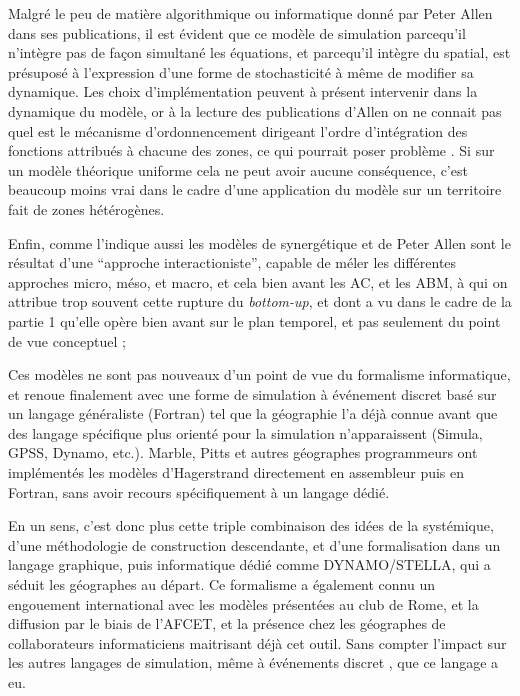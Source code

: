 Malgré le peu de matière algorithmique ou informatique donné par Peter Allen dans ses publications, il est évident que ce modèle de simulation parcequ'il n'intègre pas de façon simultané les équations, et parcequ'il intègre du spatial, est présuposé à l'expression d'une forme de stochasticité à même de modifier sa dynamique. Les choix d'implémentation peuvent à présent intervenir dans la dynamique du modèle, or à la lecture des publications d'Allen on ne connait pas quel est le mécanisme d'ordonnencement dirigeant l'ordre d'intégration des fonctions attribués à chacune des zones, ce qui pourrait poser problème \autocite[231-233]{Varenne2014}. Si sur un modèle théorique uniforme cela ne peut avoir aucune conséquence, c'est beaucoup moins vrai dans le cadre d'une application du modèle sur un territoire fait de zones hétérogènes.

Enfin, comme l'indique aussi \textcites[850]{Sanders2013}{Pumain2013} les modèles de synergétique et de Peter Allen sont le résultat d'une \enquote{approche interactioniste}, capable de méler les différentes approches micro, méso, et macro, et cela bien avant les AC, et les ABM, à qui on attribue trop souvent cette rupture du \textit{bottom-up}, et dont a vu dans le cadre de la partie 1 qu'elle opère bien avant sur le plan temporel, et pas seulement du point de vue conceptuel \autocites{Orcutt1957,Hagerstrand1967};

Ces modèles ne sont pas nouveaux d'un point de vue du formalisme informatique, et renoue finalement avec une forme de simulation à événement discret basé sur un langage généraliste (Fortran) tel que la géographie l'a déjà connue avant que des langage spécifique plus orienté pour la simulation n'apparaissent (Simula, GPSS, Dynamo, etc.). Marble, Pitts et autres géographes programmeurs ont implémentés les modèles d'Hagerstrand directement en assembleur puis en Fortran, sans avoir recours spécifiquement à un langage dédié.

En un sens, c'est donc plus cette triple combinaison des idées de la systémique, d'une méthodologie de construction descendante, et d'une formalisation dans un langage graphique, puis informatique dédié comme DYNAMO/STELLA, qui a séduit les géographes au départ. Ce formalisme a également connu un engouement international avec les modèles présentées au club de Rome, et la diffusion par le biais de l'AFCET, et la présence chez les géographes de collaborateurs informaticiens maitrisant déjà cet outil. Sans compter l'impact sur les autres langages de simulation, même à événements discret \autocite{Nance1993}, que ce langage a eu.

